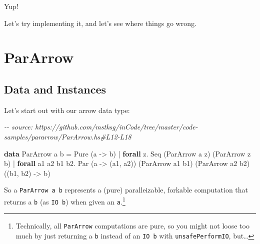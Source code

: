 \documentclass[]{article}
\newenvironment{Shaded}{}{}
\newcommand{\CommentTok}[1]{\textcolor[rgb]{0.38,0.63,0.69}{\textit{#1}}}
\newcommand{\DataTypeTok}[1]{\textcolor[rgb]{0.56,0.13,0.00}{#1}}
\newcommand{\KeywordTok}[1]{\textcolor[rgb]{0.00,0.44,0.13}{\textbf{#1}}}
\newcommand{\NormalTok}[1]{#1}
\newcommand{\OperatorTok}[1]{\textcolor[rgb]{0.40,0.40,0.40}{#1}}
\newcommand{\OtherTok}[1]{\textcolor[rgb]{0.00,0.44,0.13}{#1}}
\begin{document}
Yup!

Let's try implementing it, and let's see where things go wrong.

\hypertarget{pararrow}{%
\section{ParArrow}\label{pararrow}}

\hypertarget{data-and-instances}{%
\subsection{Data and Instances}\label{data-and-instances}}

Let's start out with our arrow data type:

\begin{Shaded}
\begin{Highlighting}[]
\CommentTok{{-}{-} source: https://github.com/mstksg/inCode/tree/master/code{-}samples/pararrow/ParArrow.hs\#L12{-}L18}

\KeywordTok{data} \DataTypeTok{ParArrow}\NormalTok{ a b }\OtherTok{=}                     \DataTypeTok{Pure}\NormalTok{  (a }\OtherTok{{-}>}\NormalTok{ b)}
                  \OperatorTok{|} \KeywordTok{forall}\NormalTok{ z}\OperatorTok{.}           \DataTypeTok{Seq}\NormalTok{   (}\DataTypeTok{ParArrow}\NormalTok{ a z)}
\NormalTok{                                              (}\DataTypeTok{ParArrow}\NormalTok{ z b)}
                  \OperatorTok{|} \KeywordTok{forall}\NormalTok{ a1 a2 b1 b2}\OperatorTok{.} \DataTypeTok{Par}\NormalTok{   (a }\OtherTok{{-}>}\NormalTok{ (a1, a2))}
\NormalTok{                                              (}\DataTypeTok{ParArrow}\NormalTok{ a1 b1)}
\NormalTok{                                              (}\DataTypeTok{ParArrow}\NormalTok{ a2 b2)}
\NormalTok{                                              ((b1, b2) }\OtherTok{{-}>}\NormalTok{ b)}
\end{Highlighting}
\end{Shaded}

So a \texttt{ParArrow\ a\ b} represents a (pure) paralleizable, forkable
computation that returns a \texttt{b} (as \texttt{IO\ b}) when given an
\texttt{a}.\footnote{Technically, all \texttt{ParArrow} computations are pure,
  so you might not loose too much by just returning a \texttt{b} instead of an
  \texttt{IO\ b} with \texttt{unsafePerformIO}, but\ldots{}}
\end{document}
